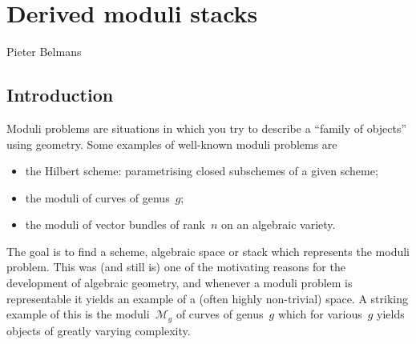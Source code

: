 \chapter{Derived moduli stacks}
\begin{flushright}
  Pieter Belmans
\end{flushright}

\begin{refsection}

\section{Introduction}
Moduli problems are situations in which you try to describe a ``family of objects'' using geometry. Some examples of well-known moduli problems are
\begin{itemize}
  \item the Hilbert scheme: parametrising closed subschemes of a given scheme;
  \item the moduli of curves of genus~$g$;
  \item the moduli of vector bundles of rank~$n$ on an algebraic variety.
\end{itemize}
The goal is to find a scheme, algebraic space or stack which represents the moduli problem. This was (and still is) one of the motivating reasons for the development of algebraic geometry, and whenever a moduli problem is representable it yields an example of a (often highly non-trivial) space. A striking example of this is the moduli~$\mathcal{M}_g$ of curves of genus~$g$ which for various~$g$ yields objects of greatly varying complexity.


\end{refsection}
